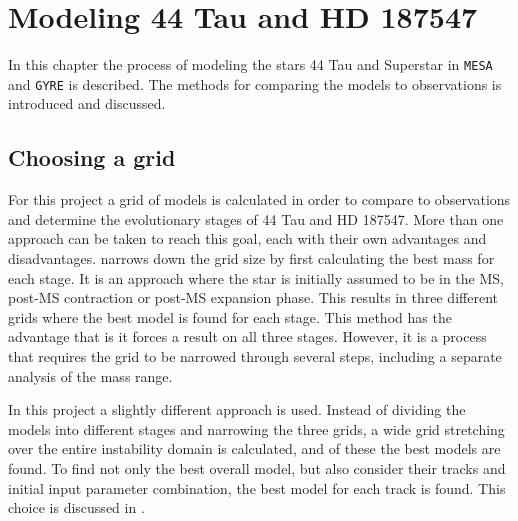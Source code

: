 \chapter{Modeling 44 Tau and HD 187547}
\label{modeling}
In this chapter the process of modeling the stars 44 Tau and Superstar in \texttt{MESA} and \texttt{GYRE} is described. The methods for comparing the models to  observations is introduced and discussed.

\section{Choosing a grid}
\label{sec:grid}
For this project a grid of models is calculated in order to compare to observations and determine the evolutionary stages of 44 Tau and HD 187547. More than one approach can be taken to reach this goal, each with their own advantages and disadvantages. \citet{lenz2010delta} narrows down the grid size by first calculating the best mass for each stage. It is an approach where the star is initially assumed to be in the MS, post-MS contraction or post-MS expansion phase. This results in three different grids where the best model is found for each stage. This method has the advantage that is it forces a result on all three stages. However, it is a process that requires the grid to be narrowed through several steps, including a separate analysis of the mass range.

In this project a slightly different approach is used. Instead of dividing the models into different stages and narrowing the three grids, a wide grid stretching over the entire instability domain is calculated, and of these the best models are found. To find not only the best overall model, but also consider their tracks and initial input parameter combination, the best model for each track is found. This choice is discussed in . 

